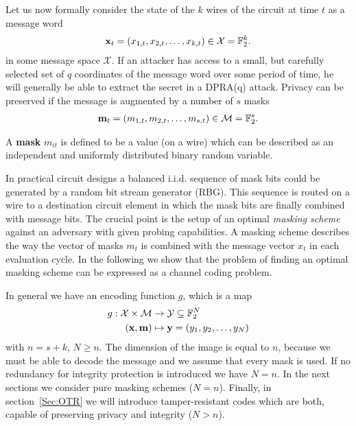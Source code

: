 \documentclass[11pt]{llncs}
\newcommand{\BDEF}{\begin{definition}}  \newcommand{\EDEF}{\end{definition}}
\begin{document}
Let us now formally consider the state of the $k$ wires of the circuit
at time $t$ as a message word
\begin{align*}
   \mathbf{x}_t = (x_{1,t}, x_{2,t}, \dots, x_{k,t}) \in \mathcal X = \mathbb{F}_2^k.
\end{align*}
in some message space $\mathcal X$.
If an attacker has access to a small, but carefully selected set of $q$
coordinates of the message word over some period of time,
he will generally be able to extract the secret in a DPRA(q) attack.
Privacy can be preserved if the message is augmented by a
number of $s$ masks
\begin{align*}
   \mathbf{m}_t = (m_{1,t}, m_{2,t}, \dots, m_{s,t}) \in \mathcal M = \mathbb{F}_2^s.
\end{align*}
\BDEF\label{Def:Mask}
A \textbf{mask} $m_{it}$ is defined to be a value (on a wire) which can be described as
an independent and uniformly distributed binary random variable.
\EDEF
In practical circuit designs a balanced i.i.d. sequence of mask bits
could be generated by a random bit stream generator (RBG).
This sequence is routed on a wire to a
destination circuit element in which the mask bits
are finally
combined with message bits.
The crucial point is the setup of an optimal \emph{masking scheme}
against an adversary with given probing capabilities.
A masking scheme describes the way the vector of masks $m_t$
is combined with the message vector $x_t$ in each evaluation cycle.
In the following we show that the problem of finding an optimal masking scheme
can be expressed as a channel coding problem.

In general we have an encoding function $g$,
which is a map
\begin{align*}
   g: \mathcal X \times \mathcal M &\rightarrow \mathcal Y \subseteq \mathbb{F}_2^N\\
                                (\mathbf{x}, \mathbf{m})&\mapsto \mathbf{y} = (y_1,y_2,\dots,y_N)
\end{align*}
with $n = s+k$,  $N \ge n$.
The dimension of the image is equal to $n$, because we must be able to
decode the message and we assume that every mask is used.
If no redundancy for integrity protection is introduced we have $N = n$.
In the next sections we consider pure masking schemes ($N = n$).
Finally, in section~\ref{Sec:OTR} we will introduce
tamper-resistant codes which are both, capable of
preserving privacy and integrity ($N>n$).
\end{document}

